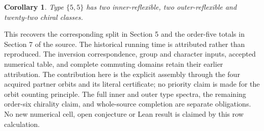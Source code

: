 \documentclass[11pt]{article}
\newtheorem{corollary}[theorem]{Corollary}
\begin{document}
\begin{corollary}
Type $\{5,5\}$ has two inner-reflexible, two outer-reflexible and
twenty-two chiral classes.
\end{corollary}
This recovers the corresponding split in Section 5 and the order-five
totals in Section 7 of the source. The historical running time is
attributed rather than reproduced. The inversion correspondence,
group and character inputs, accepted numerical table, and complete
commuting domains retain their earlier attribution. The contribution
here is the explicit assembly through the four acquired partner orbits
and its literal certificate; no priority claim is made for the orbit
counting principle. The full inner and outer type spectra, the remaining
order-six chirality claim, and whole-source completion are separate
obligations. No new numerical cell, open conjecture or Lean result is
claimed by this row calculation.
\end{document}
